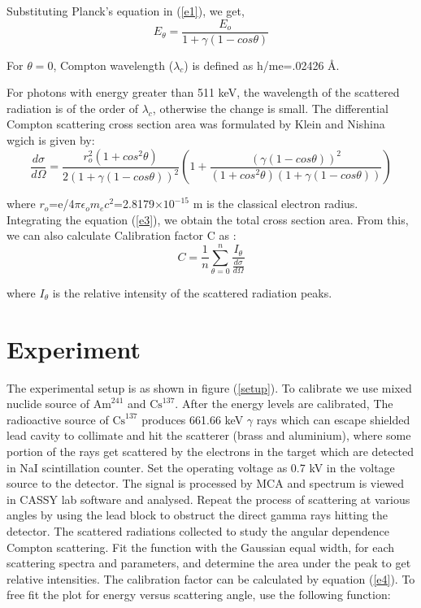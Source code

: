 \documentclass[a4paper, amsfonts, amssymb, amsmath, reprint, showkeys, nofootinbib, twoside]{revtex4-1}
\begin{document}
Substituting Planck's equation in (\ref{e1}), we get,
\begin{equation}\label{e2}
	E_\theta=\frac{E_o}{1+\gamma(1-cos\theta)}
\end{equation}

For $\theta=0$, Compton wavelength ($\lambda_c$) is defined as h/me=.02426 \AA. 

For photons with energy greater than 511 keV, the wavelength of the scattered radiation is of the order of $\lambda_c$, otherwise the change is small. The differential Compton scattering cross section area was formulated by Klein and Nishina wgich is given by:
\begin{equation}\label{e3}
	\frac{d\sigma}{d\Omega}=\frac{r_o^2(1+cos^2\theta)}{2(1+\gamma(1-cos\theta))^2}\left( 1+\frac{(\gamma(1-cos\theta))^2}{(1+cos^2\theta)(1+\gamma(1-cos\theta))}\right) 
\end{equation}

where $r_o$=e/4$\pi$$\epsilon_o$$m_e c^2$=2.8179$\times$$10^{-15}$ m is the classical electron radius. Integrating the equation (\ref{e3}), we obtain the total cross section area. From this, we can also calculate Calibration factor C as :
\begin{equation}\label{e4}
	C=\frac{1}{n}\sum_{\theta=0}^{n}\frac{I_\theta}{\frac{d\sigma}{d\Omega}}
\end{equation}

where $I_\theta$ is the relative intensity of the scattered radiation peaks.

\section{Experiment}
The experimental setup is as shown in figure (\ref{setup}). To calibrate we use mixed nuclide source of $\text{Am}^{241}$ and $\text{Cs}^{137}$. After the energy levels are calibrated, The radioactive source of $\text{Cs}^{137}$ produces 661.66 keV $\gamma$ rays which can escape shielded lead cavity to collimate and hit the scatterer (brass and aluminium), where some portion of the rays get scattered by the electrons in the target which are detected in NaI scintillation counter. Set the operating voltage as 0.7 kV in the voltage source to the detector. The signal is processed by MCA and spectrum is viewed in CASSY lab software and analysed. Repeat the process of scattering at various angles by using the lead block to obstruct the direct gamma rays hitting the detector. The scattered radiations collected to study the angular dependence Compton scattering. Fit the function with the Gaussian equal width, for each scattering spectra and parameters, and determine the area under the peak to get relative intensities. The calibration factor can be calculated by equation (\ref{e4}). To free fit the plot for energy versus scattering angle, use the following function:
\end{document}
